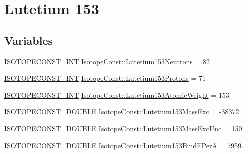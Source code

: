 \hypertarget{group___isotope_const-_lutetium-_lu153}{}\section{Lutetium 153}
\label{group___isotope_const-_lutetium-_lu153}
\subsection*{Variables}
\begin{DoxyCompactItemize}
\item 
\mbox{\hyperlink{group___isotope_const-_macros_ga5f18360b3e99483a35c32d789e62621c}{I\+S\+O\+T\+O\+P\+E\+C\+O\+N\+S\+T\+\_\+\+I\+NT}} \mbox{\hyperlink{group___isotope_const-_lutetium-_lu153_gaa663595eba1bd7dd656af914dbfc992e}{Isotope\+Const\+::\+Lutetium153\+Neutrons}} = 82
\item 
\mbox{\hyperlink{group___isotope_const-_macros_ga5f18360b3e99483a35c32d789e62621c}{I\+S\+O\+T\+O\+P\+E\+C\+O\+N\+S\+T\+\_\+\+I\+NT}} \mbox{\hyperlink{group___isotope_const-_lutetium-_lu153_gad1a5ce58c0cc383786c26e61623d6288}{Isotope\+Const\+::\+Lutetium153\+Protons}} = 71
\item 
\mbox{\hyperlink{group___isotope_const-_macros_ga5f18360b3e99483a35c32d789e62621c}{I\+S\+O\+T\+O\+P\+E\+C\+O\+N\+S\+T\+\_\+\+I\+NT}} \mbox{\hyperlink{group___isotope_const-_lutetium-_lu153_ga0e082e6e691ad912903effeaef6ea9c9}{Isotope\+Const\+::\+Lutetium153\+Atomic\+Weight}} = 153
\item 
\mbox{\hyperlink{group___isotope_const-_macros_ga8f45a7272ce02c0b4c65c44636ed719a}{I\+S\+O\+T\+O\+P\+E\+C\+O\+N\+S\+T\+\_\+\+D\+O\+U\+B\+LE}} \mbox{\hyperlink{group___isotope_const-_lutetium-_lu153_ga31677a529e40785b96c5662b88539abc}{Isotope\+Const\+::\+Lutetium153\+Mass\+Exc}} = -\/38372.
\item 
\mbox{\hyperlink{group___isotope_const-_macros_ga8f45a7272ce02c0b4c65c44636ed719a}{I\+S\+O\+T\+O\+P\+E\+C\+O\+N\+S\+T\+\_\+\+D\+O\+U\+B\+LE}} \mbox{\hyperlink{group___isotope_const-_lutetium-_lu153_ga3c1365dd438dbe935268b3ad89d819e5}{Isotope\+Const\+::\+Lutetium153\+Mass\+Exc\+Unc}} = 150.
\item 
\mbox{\hyperlink{group___isotope_const-_macros_ga8f45a7272ce02c0b4c65c44636ed719a}{I\+S\+O\+T\+O\+P\+E\+C\+O\+N\+S\+T\+\_\+\+D\+O\+U\+B\+LE}} \mbox{\hyperlink{group___isotope_const-_lutetium-_lu153_gae436d677a10e27b398f3faf9755972d9}{Isotope\+Const\+::\+Lutetium153\+Bind\+E\+PerA}} = 7959.
\item 

\end{DoxyCompactItemize}
